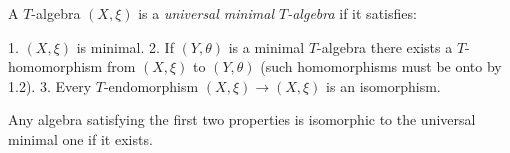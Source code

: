 A $T$-algebra $(X, \xi)$ is a \textit{universal minimal $T$-algebra} if it satisfies:

1. $(X, \xi)$ is minimal.
2. If $(Y, \theta)$ is a minimal $T$-algebra there exists a $T$-homomorphism from $(X, \xi)$ to $(Y, \theta)$ (such homomorphisms must be onto by 1.2).
3. Every $T$-endomorphism $(X, \xi) \longrightarrow (X, \xi)$ is an isomorphism.

Any algebra satisfying the first two properties is isomorphic to the universal minimal one if it exists.
